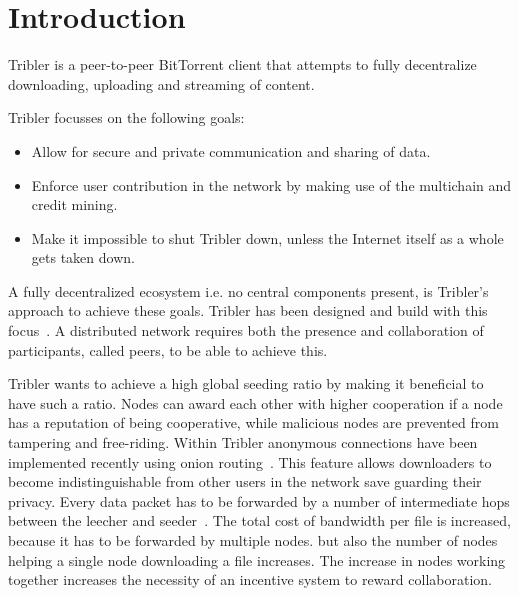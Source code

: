 \chapter{Introduction}
\label{chp:introduction}
Tribler is a peer-to-peer BitTorrent client that attempts to fully decentralize downloading, uploading and streaming of content.

Tribler focusses on the following goals:
\begin{itemize}
    \item Allow for secure and private communication and sharing of data.
    \item Enforce user contribution in the network by making use of the multichain and credit mining.
    \item Make it impossible to shut Tribler down, unless the Internet itself as a whole gets taken down.
\end{itemize}

A fully decentralized ecosystem i.e. no central components present, is Tribler's approach to achieve these goals.
Tribler has been designed and build with this focus~\cite{Pouwelse-tribler,Bakker-tribler}.
A distributed network requires both the presence and collaboration of participants, called peers, to be able to achieve this.


Tribler wants to achieve a high global seeding ratio by making it beneficial to have such a ratio.
Nodes can award each other with higher cooperation if a node has a reputation of being cooperative,
while malicious nodes are prevented from tampering and free-riding.
Within Tribler anonymous connections have been implemented recently using onion routing~\cite{Plak-anonymous,ruigrok-anonymous,tanaskoski-anonymous}.
This feature allows downloaders to become indistinguishable from other users in the network save guarding their privacy.
Every data packet has to be forwarded
by a number of intermediate hops between the leecher and seeder~\cite{Plak-anonymous,tanaskoski-anonymous}.
The total cost of bandwidth per file is increased,
because it has to be forwarded by multiple nodes.
but also the number of nodes helping a single node downloading a file increases.
The increase in nodes working together increases the necessity of an incentive system to reward collaboration.


